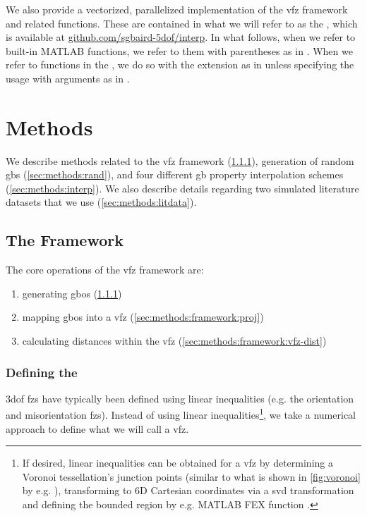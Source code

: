 \documentclass[final,twocolumn,12pt]{elsarticle}
\begin{document}
We also provide a vectorized, parallelized implementation of the \gls{vfz} framework and related functions. These are contained in what we will refer to as the \vfzorepo{}, which is available at \url{github.com/sgbaird-5dof/interp}. In what follows, when we refer to built-in MATLAB functions, we refer to them with parentheses as in . When we refer to functions in the \vfzorepo{}, we do so with the  extension as in  unless specifying the usage with arguments as in .

\section{Methods} \label{sec:methods}

We describe methods related to the \gls{vfz} framework  (\cref{sec:methods:framework:vfz}), generation of random \glspl{gb} (\cref{sec:methods:rand}), and four different \gls{gb} property interpolation schemes (\cref{sec:methods:interp}). We also describe details regarding two simulated literature datasets that we use (\cref{sec:methods:litdata}).

\subsection{The  Framework}
\label{sec:methods:framework}

The core operations of the \gls{vfz} framework are:
\begin{enumerate}
    \item generating \glspl{gbo} (\cref{sec:methods:framework:vfz})
    \item mapping \glspl{gbo} into a \gls{vfz} (\cref{sec:methods:framework:proj})
    \item calculating distances within the \gls{vfz} (\cref{sec:methods:framework:vfz-dist})
\end{enumerate}

\subsubsection{Defining the }
\label{sec:methods:framework:vfz}

\Gls{3dof} \glspl{fz} have typically been defined using linear inequalities (e.g. the orientation \cite{heinzRepresentationOrientationDisorientation1991} and misorientation \cite{grimmerUniqueDescriptionRelative1980,heinzRepresentationOrientationDisorientation1991} \glspl{fz}). Instead of using linear inequalities\footnote{If desired, linear inequalities can be obtained for a \gls{vfz} by determining a Voronoi tessellation's junction points (similar to what is shown in \cref{fig:voronoi} by e.g. ), transforming to 6D Cartesian coordinates via a \gls{svd} transformation %
and defining the bounded region by e.g. MATLAB FEX function .}, we take a numerical approach to define what we will call a \gls{vfz}.
\end{document}
